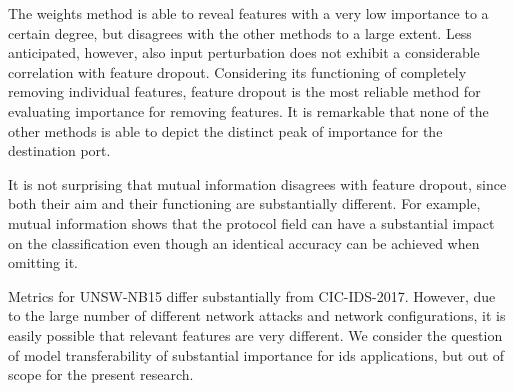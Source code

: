 \documentclass[conference]{IEEEtran}
\begin{document}
The weights method is able to reveal features with a very low importance to a certain degree, but disagrees with the other methods to a large extent. Less anticipated, however, also input perturbation does not exhibit a considerable correlation with feature dropout. Considering its functioning of completely removing individual features, feature dropout is the most reliable method for evaluating importance for removing features. It is remarkable that none of the other methods is able to depict the distinct peak of importance for the destination port.

It is not surprising that mutual information disagrees with feature dropout, since both their aim and their functioning are substantially different. For example, mutual information shows that the protocol field can have a substantial impact on the classification even though an identical accuracy can be achieved when omitting it.


Metrics for UNSW-NB15 differ substantially from CIC-IDS-2017. However, due to the large number of different network attacks and network configurations, it is easily possible that relevant features are very different. We consider the question of model transferability of substantial importance for \gls{ids} applications, but out of scope for the present research.
\end{document}
